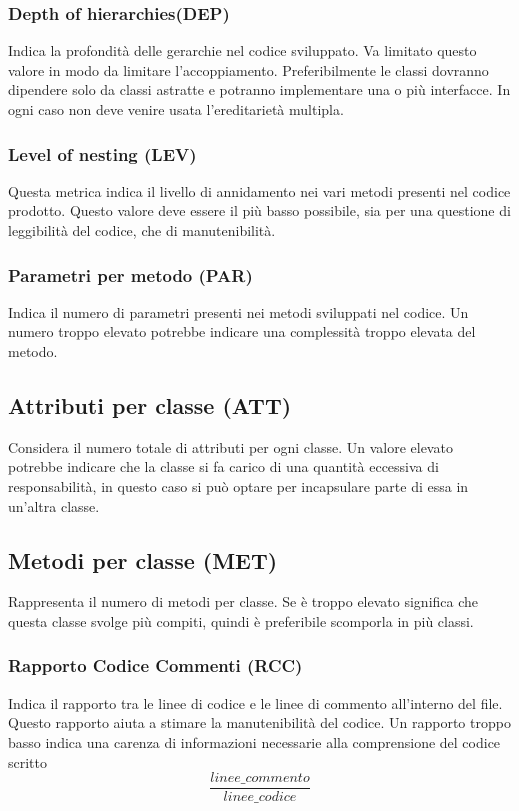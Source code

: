 \subsubsection{Depth of hierarchies(DEP)}
Indica la profondità delle gerarchie nel codice sviluppato. Va limitato questo valore in modo da limitare l'accoppiamento. Preferibilmente le classi dovranno dipendere solo da classi astratte e potranno implementare una o più interfacce. In ogni caso non deve venire usata l'ereditarietà multipla.

\subsubsection{Level of nesting (LEV)}
Questa metrica indica il livello di annidamento nei vari metodi presenti nel codice prodotto. Questo valore deve essere il più basso possibile, sia per una questione di leggibilità del codice, che di manutenibilità.


\subsubsection{Parametri per metodo (PAR)}
Indica il numero di parametri presenti nei metodi sviluppati nel codice. Un numero troppo elevato potrebbe indicare una complessità troppo elevata del metodo.

\subsection{Attributi per classe (ATT)}
Considera il numero totale di attributi per ogni classe. Un valore elevato potrebbe indicare che la classe si fa carico di una quantità eccessiva di responsabilità, in questo caso si può optare per incapsulare parte di essa in un'altra classe.

\subsection{Metodi per classe (MET)}
Rappresenta il numero di metodi per classe. Se è troppo elevato significa che questa classe svolge più compiti, quindi è preferibile scomporla in più classi.

\subsubsection{Rapporto Codice Commenti (RCC)}
Indica il rapporto tra le linee di codice e le linee di commento all'interno del file. Questo rapporto aiuta a stimare la manutenibilità del codice. Un rapporto troppo basso indica una carenza di informazioni necessarie alla comprensione del codice scritto
\[\frac{linee\_commento}{linee\_codice}\]

